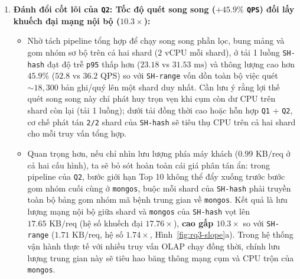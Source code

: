 \begin{enumerate}[leftmargin=0.8cm, itemsep=4pt]
  \item \textbf{Đánh đổi cốt lõi của \texttt{Q2}: Tốc độ quét song song ($+45.9\%$ \texttt{QPS}) đối lấy khuếch đại mạng nội bộ ($10.3\times$):}
  \begin{itemize}[leftmargin=0.6cm, itemsep=3pt]
    \item Nhờ tách pipeline tổng hợp để chạy song song phần lọc, bung mảng và gom nhóm sơ bộ trên cả hai shard ($2\text{ vCPU}$ mỗi shard), ở tải 1 luồng \texttt{SH-hash} đạt độ trễ \texttt{p95} thấp hơn ($23.18$ vs $31.53\text{ ms}$) và thông lượng cao hơn \textbf{$45.9\%$} ($52.8$ vs $36.2\text{ QPS}$) so với \texttt{SH-range} vốn dồn toàn bộ việc quét $\sim 18{,}300$ bản ghi/quý lên một shard duy nhất. Cần lưu ý rằng lợi thế quét song song này chỉ phát huy trọn vẹn khi cụm còn dư CPU trên shard còn lại (tải 1 luồng); dưới tải đồng thời cao hoặc hỗn hợp \texttt{Q1} + \texttt{Q2}, cơ chế phát tán \texttt{2/2} shard của \texttt{SH-hash} sẽ tiêu thụ CPU trên cả hai shard cho mỗi truy vấn tổng hợp.
    \item Quan trọng hơn, nếu chỉ nhìn lưu lượng phía máy khách ($0.99\text{ KB/req}$ ở cả hai cấu hình), ta sẽ bỏ sót hoàn toàn cái giá phân tán ẩn: trong pipeline của \texttt{Q2}, bước giới hạn Top 10 không thể đẩy xuống trước bước gom nhóm cuối cùng ở \texttt{mongos}, buộc mỗi shard của \texttt{SH-hash} phải truyền toàn bộ bảng gom nhóm mã bệnh trung gian về \texttt{mongos}. Kết quả là lưu lượng mạng nội bộ giữa shard và \texttt{mongos} của \texttt{SH-hash} vọt lên \textbf{$17.65\text{ KB/req}$} (hệ số khuếch đại \textbf{$17.76\times$}), \textbf{cao gấp $10.3\times$} so với \texttt{SH-range} ($1.71\text{ KB/req}$, hệ số $1.74\times$, Hình~\ref{fig:rq3-slope}a). Trong hệ thống vận hành thực tế với nhiều truy vấn OLAP chạy đồng thời, chính lưu lượng trung gian này sẽ tiêu hao băng thông mạng cụm và CPU trộn của \texttt{mongos}.
  \end{itemize}


\end{enumerate}
